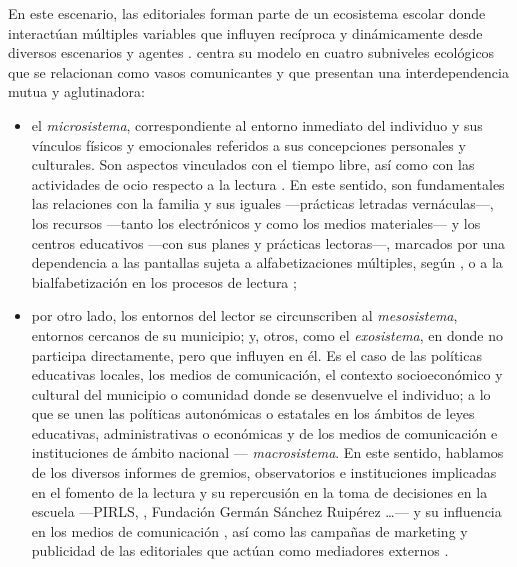 \documentclass[spanish]{textolivre}
\begin{document}
En este escenario, las editoriales forman parte de un ecosistema escolar \cite{romero_oliva_habitos_2020} donde interactúan múltiples variables que influyen recíproca y dinámicamente desde diversos escenarios y agentes \cite{bronfenbrenner1983}. \textcite{bronfenbrenner_ecologia_1987} centra su modelo en cuatro subniveles ecológicos que se relacionan como vasos comunicantes y que presentan una interdependencia mutua y aglutinadora: 
\begin{itemize}
    \item el \emph{microsistema}, correspondiente al entorno inmediato del individuo \cite{sanjuan2011} y sus vínculos físicos y emocionales referidos a sus concepciones personales y culturales. Son aspectos vinculados con el tiempo libre, así como con las actividades de ocio respecto a la lectura \cite{crespo2016ocio}. En este sentido, son fundamentales las relaciones con la familia y sus iguales —prácticas letradas vernáculas—, los recursos —tanto los electrónicos y como los medios materiales— y los centros educativos —con sus planes y prácticas lectoras—, marcados por una dependencia a las pantallas sujeta a alfabetizaciones múltiples, según \textcite{jenkins2015cultura}, o a la bialfabetización en los procesos de lectura \cite{wolf2020};
    \item por otro lado, los entornos del lector se circunscriben al \emph{mesosistema}, entornos cercanos de su municipio; y, otros, como el \emph{exosistema}, en donde no participa directamente, pero que influyen en él. Es el caso de las políticas educativas locales, los medios de comunicación, el contexto socioeconómico y cultural del municipio o comunidad donde se desenvuelve el individuo; a lo que se unen las políticas autonómicas o estatales en los ámbitos de leyes educativas, administrativas o económicas y de los medios de comunicación e instituciones de ámbito nacional — \emph{macrosistema}. En este sentido, hablamos de los diversos informes de gremios, observatorios e instituciones implicadas en el fomento de la lectura y su repercusión en la toma de decisiones en la escuela —PIRLS, \textcite{FGEE}, Fundación Germán Sánchez Ruipérez …— y su influencia en los medios de comunicación \cite{reig2009comunicacion}, así como las campañas de marketing y publicidad de las editoriales que actúan como mediadores externos \cite{garcia2013papel}. 
\end{itemize}
\end{document}
